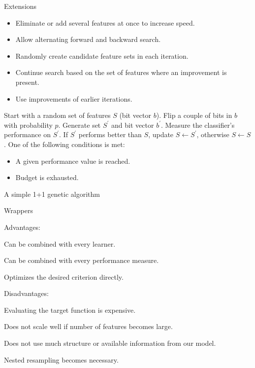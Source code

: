 \documentclass[11pt,compress,t,notes=noshow, xcolor=table]{beamer}
\begin{document}
  \begin{vbframe}{Extensions}

    \begin{itemize}
      \setlength{\itemsep}{1.0em}
      \item Eliminate or add several features at once to increase speed.
      \item Allow alternating forward and backward search.
      \item Randomly create candidate feature sets in each iteration.
      \item Continue search based on the set of features where an improvement is present.
      \item Use improvements of earlier iterations.
    \end{itemize}

    \framebreak

    \begin{algorithm}[H]
    \begin{algorithmic}[1]
      \State Start with a random set of features $S$ (bit vector $b$).
      \Repeat
      \State Flip a couple of bits in $b$ with probability $p$.
      \State Generate set $S^\prime$ and bit vector $b^\prime$.
      \State Measure the classifier's performance on $S^\prime$.
      \State If $S^\prime$ performs better than $S$, update $S \leftarrow S^\prime$, otherwise $S \leftarrow S$.
      \Until One of the following conditions is met:
        \begin{itemize}
          \item A given performance value is reached.
          \item Budget is exhausted.
        \end{itemize}
        \caption{A simple 1+1 genetic algorithm}
    \end{algorithmic}
    \end{algorithm}

    \end{vbframe}

  \begin{vbframe}{Wrappers}

    \begin{blocki}{Advantages:}
      \item Can be combined with every learner.
      \item Can be combined with every performance measure.
      \item Optimizes the desired criterion directly.
    \end{blocki}

    \lz

    \begin{blocki}{Disadvantages:}
      \item Evaluating the target function is expensive.
      \item Does not scale well if number of features becomes large.
      \item Does not use much structure or available information from our model.
      \item Nested resampling becomes necessary.
    \end{blocki}

  \end{vbframe}
\end{document}
